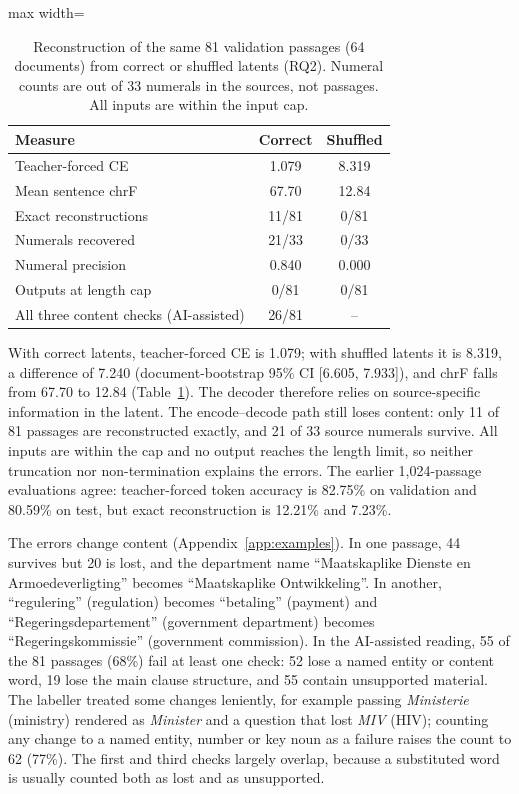 \documentclass[11pt,a4paper]{article}
\begin{document}
\begin{table}[t]
\centering
\small
\setlength{\tabcolsep}{4pt}
\begin{adjustbox}{max width=\columnwidth}
\begin{tabular}{lcc}
\toprule
Measure & Correct & Shuffled \\
\midrule
Teacher-forced CE & 1.079 & 8.319 \\
Mean sentence chrF & 67.70 & 12.84 \\
Exact reconstructions & 11/81 & 0/81 \\
Numerals recovered & 21/33 & 0/33 \\
Numeral precision & 0.840 & 0.000 \\
Outputs at length cap & 0/81 & 0/81 \\
All three content checks (AI-assisted) & 26/81 & -- \\
\bottomrule
\end{tabular}
\end{adjustbox}
\caption{Reconstruction of the same 81 validation passages (64 documents) from correct or shuffled latents (RQ2). Numeral counts are out of 33 numerals in the sources, not passages. All inputs are within the input cap.}
\label{tab:recon}
\end{table}

With correct latents, teacher-forced CE is 1.079; with shuffled latents it is 8.319, a difference of 7.240 (document-bootstrap 95\% CI [6.605, 7.933]), and chrF falls from 67.70 to 12.84 (Table~\ref{tab:recon}). The decoder therefore relies on source-specific information in the latent. The encode--decode path still loses content: only 11 of 81 passages are reconstructed exactly, and 21 of 33 source numerals survive. All inputs are within the cap and no output reaches the length limit, so neither truncation nor non-termination explains the errors. The earlier 1,024-passage evaluations agree: teacher-forced token accuracy is 82.75\% on validation and 80.59\% on test, but exact reconstruction is 12.21\% and 7.23\%.

The errors change content (Appendix~\ref{app:examples}). In one passage, 44 survives but 20 is lost, and the department name ``Maatskaplike Dienste en Armoedeverligting'' becomes ``Maatskaplike Ontwikkeling''. In another, ``regulering'' (regulation) becomes ``betaling'' (payment) and ``Regeringsdepartement'' (government department) becomes ``Regeringskommissie'' (government commission). In the AI-assisted reading, 55 of the 81 passages (68\%) fail at least one check: 52 lose a named entity or content word, 19 lose the main clause structure, and 55 contain unsupported material. The labeller treated some changes leniently, for example passing \emph{Ministerie} (ministry) rendered as \emph{Minister} and a question that lost \emph{MIV} (HIV); counting any change to a named entity, number or key noun as a failure raises the count to 62 (77\%). The first and third checks largely overlap, because a substituted word is usually counted both as lost and as unsupported.
\end{document}
